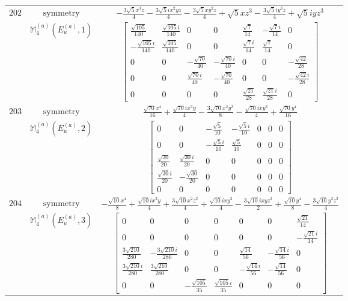 \documentclass[fleqn,8pt,landscape]{jsarticle}
\begin{document}
\begin{longtable}{ccc}
$ 202 $ & $ \text{symmetry} $ & $ - \frac{3 \sqrt{5} x^{3} z}{4} - \frac{3 \sqrt{5} i x^{2} y z}{4} - \frac{3 \sqrt{5} x y^{2} z}{4} + \sqrt{5} x z^{3} - \frac{3 \sqrt{5} i y^{3} z}{4} + \sqrt{5} i y z^{3} $ \\
$  $ & $ \mathbb{M}_{4}^{(a)}(E_{u}^{(a)},1) $ & $ \begin{bmatrix} \frac{\sqrt{105}}{140} & \frac{\sqrt{105} i}{140} & 0 & 0 & \frac{\sqrt{7}}{14} & - \frac{\sqrt{7} i}{14} & 0 \\ - \frac{\sqrt{105} i}{140} & \frac{\sqrt{105}}{140} & 0 & 0 & \frac{\sqrt{7} i}{14} & \frac{\sqrt{7}}{14} & 0 \\ 0 & 0 & - \frac{\sqrt{70}}{40} & - \frac{\sqrt{70} i}{40} & 0 & 0 & - \frac{\sqrt{42}}{28} \\ 0 & 0 & \frac{\sqrt{70} i}{40} & - \frac{\sqrt{70}}{40} & 0 & 0 & - \frac{\sqrt{42} i}{28} \\ 0 & 0 & 0 & 0 & \frac{\sqrt{21}}{28} & \frac{\sqrt{21} i}{28} & 0 \end{bmatrix} $ \\ \hline
$ 203 $ & $ \text{symmetry} $ & $ \frac{\sqrt{70} x^{4}}{16} + \frac{\sqrt{70} i x^{3} y}{4} - \frac{3 \sqrt{70} x^{2} y^{2}}{8} - \frac{\sqrt{70} i x y^{3}}{4} + \frac{\sqrt{70} y^{4}}{16} $ \\
$  $ & $ \mathbb{M}_{4}^{(a)}(E_{u}^{(a)},2) $ & $ \begin{bmatrix} 0 & 0 & - \frac{\sqrt{5}}{10} & - \frac{\sqrt{5} i}{10} & 0 & 0 & 0 \\ 0 & 0 & - \frac{\sqrt{5} i}{10} & \frac{\sqrt{5}}{10} & 0 & 0 & 0 \\ \frac{\sqrt{30}}{20} & \frac{\sqrt{30} i}{20} & 0 & 0 & 0 & 0 & 0 \\ \frac{\sqrt{30} i}{20} & - \frac{\sqrt{30}}{20} & 0 & 0 & 0 & 0 & 0 \\ 0 & 0 & 0 & 0 & 0 & 0 & 0 \end{bmatrix} $ \\ \hline
$ 204 $ & $ \text{symmetry} $ & $ - \frac{\sqrt{10} x^{4}}{8} + \frac{\sqrt{10} i x^{3} y}{4} + \frac{3 \sqrt{10} x^{2} z^{2}}{4} + \frac{\sqrt{10} i x y^{3}}{4} - \frac{3 \sqrt{10} i x y z^{2}}{2} + \frac{\sqrt{10} y^{4}}{8} - \frac{3 \sqrt{10} y^{2} z^{2}}{4} $ \\
$  $ & $ \mathbb{M}_{4}^{(a)}(E_{u}^{(a)},3) $ & $ \begin{bmatrix} 0 & 0 & 0 & 0 & 0 & 0 & \frac{\sqrt{21}}{14} \\ 0 & 0 & 0 & 0 & 0 & 0 & - \frac{\sqrt{21} i}{14} \\ \frac{3 \sqrt{210}}{280} & - \frac{3 \sqrt{210} i}{280} & 0 & 0 & \frac{\sqrt{14}}{56} & - \frac{\sqrt{14} i}{56} & 0 \\ \frac{3 \sqrt{210} i}{280} & \frac{3 \sqrt{210}}{280} & 0 & 0 & - \frac{\sqrt{14} i}{56} & - \frac{\sqrt{14}}{56} & 0 \\ 0 & 0 & - \frac{\sqrt{105}}{35} & \frac{\sqrt{105} i}{35} & 0 & 0 & 0 \end{bmatrix} $ \\ \hline

\end{longtable}
\end{document}
